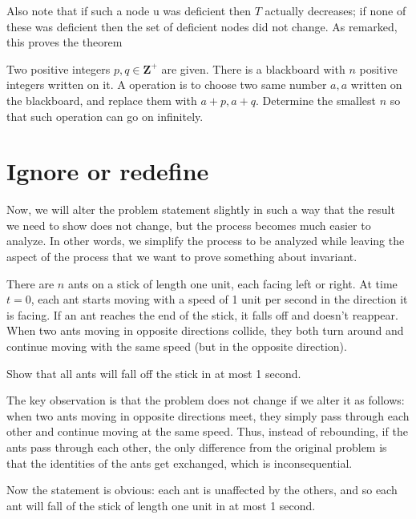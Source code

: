Also note that if such a node u was deficient then $T$ actually decreases; if none of these was deficient then the set of deficient nodes did not change. As remarked, this proves the theorem

\begin{example} 
    Two positive integers $p,q \in \mathbf{Z}^{+}$ are given. There is a blackboard with $n$ positive integers written on it. A operation is to choose two same number $a,a$ written on the blackboard, and replace them with $a+p,a+q$. Determine the smallest $n$ so that such operation can go on infinitely.
\end{example}

\section{Ignore or redefine}

Now, we will alter the problem statement slightly in such a way that the result we need to show does not change, but the process becomes much easier to analyze. In other words, we simplify the process to be analyzed while leaving the aspect of the process that we want to prove something about invariant.

\begin{example}
    There are $n$ ants on a stick of length one unit, each facing left or right. At time $t = 0$, each ant starts moving with a speed of 1 unit per second in the direction it is facing. If an ant reaches the end of the stick, it falls off and doesn’t reappear. When two ants moving in opposite directions collide, they both turn around and continue moving with the same speed (but in the opposite direction).
    
    Show that all ants will fall off the stick in at most 1 second.
\end{example}

The key observation is that the problem does not change if we alter it as follows: when two ants moving in opposite directions meet, they simply pass through each other and continue moving at the same speed. Thus, instead of rebounding, if the ants pass through each other, the only difference from the original problem is that the identities of the ants get exchanged, which is inconsequential.

Now the statement is obvious: each ant is unaffected by the others, and so each ant will fall of the stick of length one unit in at most 1 second. 

